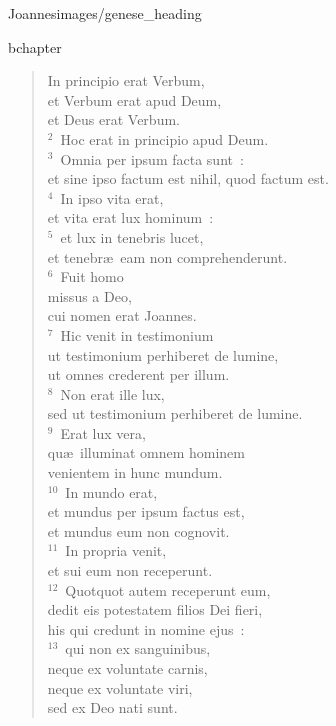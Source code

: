 {Joannes}{images/genese_heading}

bchapter\begin{verse}\vspace{-11pt}In principio erat Verbum,\\ et Verbum erat apud Deum,\\ et Deus erat Verbum.\\
${}^{2}$~Hoc erat in principio apud Deum.\\
${}^{3}$~Omnia per ipsum facta sunt~:\\ et sine ipso factum est nihil, quod factum est.\\
${}^{4}$~In ipso vita erat,\\ et vita erat lux hominum~:\\
${}^{5}$~et lux in tenebris lucet,\\ et tenebr\ae\ eam non comprehenderunt.\\
${}^{6}$~Fuit homo\\ missus a Deo,\\ cui nomen erat Joannes.\\
${}^{7}$~Hic venit in testimonium\\ ut testimonium perhiberet de lumine,\\ ut omnes crederent per illum.\\
${}^{8}$~Non erat ille lux,\\ sed ut testimonium perhiberet de lumine.\\
${}^{9}$~Erat lux vera,\\ qu\ae\ illuminat omnem hominem\\ venientem in hunc mundum.\\
${}^{10}$~In mundo erat,\\ et mundus per ipsum factus est,\\ et mundus eum non cognovit.\\
${}^{11}$~In propria venit,\\ et sui eum non receperunt.\\
${}^{12}$~Quotquot autem receperunt eum,\\ dedit eis potestatem filios Dei fieri,\\ his qui credunt in nomine ejus~:\\
${}^{13}$~qui non ex sanguinibus,\\ neque ex voluntate carnis,\\ neque ex voluntate viri,\\ sed ex Deo nati sunt.\\

\end{verse}
